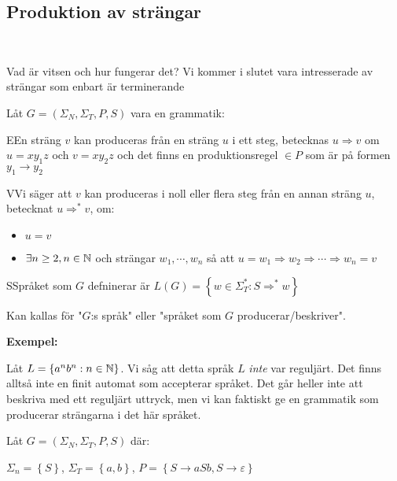 \subsection{Produktion av strängar}\hfill\\\par
\noindent Vad är vitsen och hur fungerar det? Vi kommer i slutet vara intresserade av strängar som enbart är terminerande
\par\bigskip
\noindent Låt $G = (\Sigma_N,\Sigma_T, P, S)$ vara en grammatik:
\par\bigskip
\begin{theo}
  EEn sträng $v$ kan produceras från en sträng $u$ i ett steg, betecknas $u\Rightarrow v$ om $u = xy_1z$ och $v=xy_2z$ och det finns en produktionsregel $\in P$ som är på formen $y_1\to y_2$ 
\end{theo}
\par\bigskip
\begin{theo}
  VVi säger att $v$ kan produceras i noll eller flera steg från en annan sträng $u$, betecknat $u\Rightarrow^* v$, om:
  \begin{itemize}
    \item $u=v$
    \item $\exists n\geq2, n\in\mathbb{N}$ och strängar $w_1,\cdots, w_n$ så att $u=w_1\Rightarrow w_2\Rightarrow\cdots\Rightarrow w_n = v$
  \end{itemize}
\end{theo}
\par\bigskip
\begin{theo}
  SSpråket som $G$ defninerar är $L(G) = \left\{w\in\Sigma_T^*:S\Rightarrow^*w\right\}$\par
  \noindent Kan kallas för "$G$:s språk" eller "språket som $G$ producerar/beskriver".
\end{theo}
\par\bigskip
\noindent\textbf{Exempel:}\par
\noindent Låt $L = \left\{a^nb^n:n\in\mathbb{N}\right\}$. Vi såg att detta språk $L$ \textit{inte} var reguljärt. Det finns alltså inte en finit automat som accepterar språket. Det går heller inte att beskriva med ett reguljärt uttryck, men vi kan faktiskt ge en grammatik som producerar strängarna i det här språket.
\par\bigskip
\noindent Låt $G = (\Sigma_N,\Sigma_T,P,S)$ där:\par
$\Sigma_n = \left\{S\right\}$, $\Sigma_T = \left\{a,b\right\}$, $P = \left\{S\to aSb, S\to\varepsilon\right\}$
\par\bigskip
